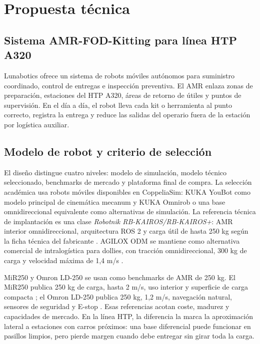 \chapter{Propuesta técnica}

\section{Sistema AMR-FOD-Kitting para línea HTP A320}

Lunabotics ofrece un sistema de robots móviles autónomos para suministro coordinado, control de entregas e inspección preventiva. El AMR enlaza zonas de preparación, estaciones del HTP A320, áreas de retorno de útiles y puntos de supervisión. En el día a día, el robot lleva cada kit o herramienta al punto correcto, registra la entrega y reduce las salidas del operario fuera de la estación por logística auxiliar.

\section{Modelo de robot y criterio de selección}

El diseño distingue cuatro niveles: modelo de simulación, modelo técnico seleccionado, benchmarks de mercado y plataforma final de compra. La selección académica usa robots móviles disponibles en CoppeliaSim: KUKA YouBot como modelo principal de cinemática mecanum y KUKA Omnirob o una base omnidireccional equivalente como alternativas de simulación. La referencia técnica de implantación es una clase \textit{Robotnik RB-KAIROS/RB-KAIROS+}: AMR interior omnidireccional, arquitectura ROS 2 y carga útil de hasta 250 kg según la ficha técnica del fabricante \cite{robotnikRbKairos,robotnikRbKairosDatasheet}. AGILOX ODM se mantiene como alternativa comercial de intralogística para dollies, con tracción omnidireccional, 300 kg de carga y velocidad máxima de 1,4 m/s \cite{agiloxOdm}.

MiR250 y Omron LD-250 se usan como benchmarks de AMR de 250 kg. El MiR250 publica 250 kg de carga, hasta 2 m/s, uso interior y superficie de carga compacta \cite{mir250Specs}; el Omron LD-250 publica 250 kg, 1,2 m/s, navegación natural, sensores de seguridad y E-stop \cite{omronLd250}. Esas referencias acotan coste, madurez y capacidades de mercado. En la línea HTP, la diferencia la marca la aproximación lateral a estaciones con carros próximos: una base diferencial puede funcionar en pasillos limpios, pero pierde margen cuando debe entregar sin girar toda la carga.

